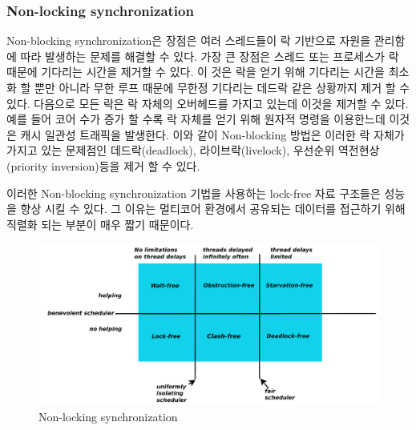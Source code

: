 \subsubsection{Non-locking synchronization}



Non-blocking synchronization은 장점은 여러 스레드들이 락 기반으로 자원을 관리함에 따라
 발생하는 문제를 해결할 수 있다. 
가장 큰 장점은 스레드 또는 프로세스가 락 때문에 기다리는 시간을 제거할 수 있다.
이 것은 락을 얻기 위해 기다리는 시간을 최소화 할 뿐만 아니라 무한 루프 때문에 무한정 기다리는 
데드락 같은 상황까지 제거 할 수 있다. 
다음으로 모든 락은 락 자체의 오버헤드를 가지고 있는데 이것을 제거할 수 있다. 
예를 들어 코어 수가 증가 할 수록 락 자체를 얻기 위해 원자적 명령을 이용한느데 이것은 캐시 일관성 트래픽을 
발생한다. 
이와 같이 Non-blocking 방법은 이러한 락 자체가 가지고 있는 문제점인 데드락(deadlock), 라이브락(livelock), 
우선순위 역전현상(priority inversion)등을 제거 할 수 있다. 

이러한 Non-blocking synchronization 기법을 사용하는 lock-free 자료 구조들은 성능을 향상 시킬 수 있다. 
그 이유는 멀티코어 환경에서 공유되는 데이터를 접근하기 위해 직렬화 되는 부분이 매우 짧기 때문이다. 

\begin{figure}[h!]
    \centering
    \includegraphics[width=1\textwidth]{fig/NBS/NBS}
    \caption{Non-locking synchronization}
  \label{fig:NBS}
\end{figure}


